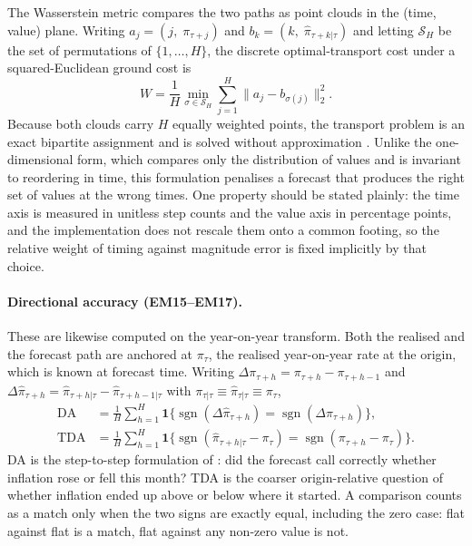 \documentclass[12pt]{article}
\begin{document}
The Wasserstein metric compares the two paths as point clouds in the
(time, value) plane. Writing $a_j = (j,\; \pi_{\tau+j})$ and
$b_k = (k,\; \hat{\pi}_{\tau+k|\tau})$ and letting $\mathcal{S}_H$ be the set of
permutations of $\{1,\dots,H\}$, the discrete optimal-transport cost under a
squared-Euclidean ground cost is
\begin{equation}
    W = \frac{1}{H} \min_{\sigma \in \mathcal{S}_H}
        \sum_{j=1}^{H} \big\| a_j - b_{\sigma(j)} \big\|_2^2 .
\end{equation}
Because both clouds carry $H$ equally weighted points, the transport problem is
an exact bipartite assignment and is solved without approximation
\citep{panaretos2019}. Unlike the one-dimensional form, which compares only the
distribution of values and is invariant to reordering in time, this formulation
penalises a forecast that produces the right set of values at the wrong times.
One property should be stated plainly: the time axis is measured in unitless step
counts and the value axis in percentage points, and the implementation does not
rescale them onto a common footing, so the relative weight of timing against
magnitude error is fixed implicitly by that choice.

\paragraph{Directional accuracy (EM15--EM17).}
These are likewise computed on the year-on-year transform. Both the realised and
the forecast path are anchored at $\pi_\tau$, the realised year-on-year rate at
the origin, which is known at forecast time. Writing
$\Delta \pi_{\tau+h} = \pi_{\tau+h} - \pi_{\tau+h-1}$ and
$\Delta \hat{\pi}_{\tau+h} = \hat{\pi}_{\tau+h|\tau} - \hat{\pi}_{\tau+h-1|\tau}$
with $\pi_{\tau|\tau} \equiv \hat{\pi}_{\tau|\tau} \equiv \pi_\tau$,
\begin{align}
    \text{DA}  &= \frac{1}{H} \sum_{h=1}^{H}
        \mathbf{1}\big\{\operatorname{sgn}(\Delta \hat{\pi}_{\tau+h})
        = \operatorname{sgn}(\Delta \pi_{\tau+h})\big\}, \\
    \text{TDA} &= \frac{1}{H} \sum_{h=1}^{H}
        \mathbf{1}\big\{\operatorname{sgn}(\hat{\pi}_{\tau+h|\tau} - \pi_\tau)
        = \operatorname{sgn}(\pi_{\tau+h} - \pi_\tau)\big\}.
\end{align}
DA is the step-to-step formulation of \citet{pesaran1992}: did the forecast call
correctly whether inflation rose or fell this month? TDA is the coarser
origin-relative question of whether inflation ended up above or below where it
started. A comparison counts as a match only when the two signs are exactly
equal, including the zero case: flat against flat is a match, flat against any
non-zero value is not.
\end{document}
